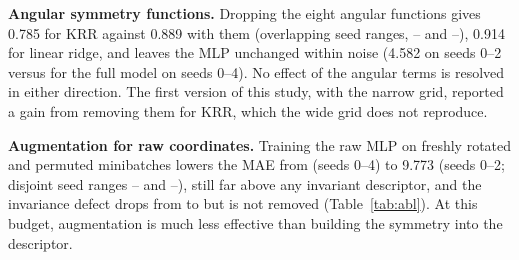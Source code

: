 \textbf{Angular symmetry functions.} Dropping the eight angular functions gives 0.785 for KRR against 0.889 with them (overlapping seed ranges, -- and --), 0.914 for linear ridge, and leaves the MLP unchanged within noise (4.582 on seeds 0--2 versus  for the full model on seeds 0--4). No effect of the angular terms is resolved in either direction. The first version of this study, with the narrow grid, reported a gain from removing them for KRR, which the wide grid does not reproduce.

\textbf{Augmentation for raw coordinates.} Training the raw MLP on freshly rotated and permuted minibatches lowers the MAE from  (seeds 0--4) to 9.773 (seeds 0--2; disjoint seed ranges -- and --), still far above any invariant descriptor, and the invariance defect drops from  to  but is not removed (Table~\ref{tab:abl}). At this budget, augmentation is much less effective than building the symmetry into the descriptor.


